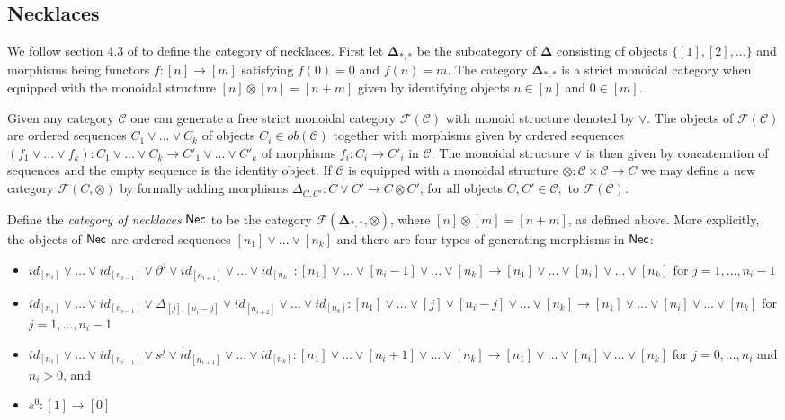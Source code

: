 \subsection{Necklaces} We follow section 4.3 of \cite{Imma, Ralph, Andy} to define the category of necklaces. First let $\mathbf{\Delta}_{*,*}$ be the subcategory of $\mathbf{\Delta}$ consisting of objects $\{ [1], [2],...\}$ and morphisms being functors $f: [n] \to [m]$ satisfying $f(0)=0$ and $f(n)=m$. The category $\mathbf{\Delta}_{*,*}$ is a strict monoidal category when equipped with the monoidal structure $[n] \otimes [m]= [n+m]$ given by identifying objects $n \in [n]$ and $0 \in [m]$.

Given any category $\mathcal{C}$ one can generate a free strict monoidal category $\mathcal{F}(\mathcal{C})$ with monoid structure denoted by $\vee$. The  objects of $\mathcal{F}(\mathcal{C})$ are ordered sequences $C_1 \vee ... \vee C_k$ of objects $C_i \in ob(\mathcal{C})$ together with morphisms given by ordered sequences $(f_1 \vee ... \vee f_k): C_1 \vee ... \vee C_k \to C'_1 \vee ... \vee C'_k$ of morphisms $f_i: C_i \to C'_i$ in $\mathcal{C}.$ The monoidal structure $\vee$ is then given by concatenation of sequences and the empty sequence is the identity object. If $\mathcal{C}$ is equipped with a monoidal structure $\otimes: \mathcal{C} \times \mathcal{C} \to C$ we may define a new category $\mathcal{F}(C, \otimes)$ by formally adding morphisms $\Delta_{C,C'}: C \vee C' \to C \otimes C'$, for all objects $C, C' \in \mathcal{C},$ to $\mathcal{F}(\mathcal{C}).$
 
Define the \textit{category of necklaces} $\mathsf{Nec}$ to be the category  $\mathcal{F}(\mathbf{\Delta}_{*,*}, \otimes)$, where $[n] \otimes [m]=[n+m]$, as defined above. More explicitly, the objects of $\mathsf{Nec}$ are ordered sequences $[n_1] \vee ... \vee[n_k]$ and there are four types of generating morphisms in $\mathsf{Nec}$:
\begin{itemize}
\item $id_{[n_1]} \vee ... \vee id_{[n_{i-1}]} \vee \partial^j \vee id_{[n_{i+1}]} \vee ... \vee id_{[n_k]}: [n_1] \vee ...\vee [n_i-1] \vee... \vee [n_k] \to [n_1] \vee ...\vee [n_i] \vee ...\vee [n_k]$
for $j=1,...,n_i-1$
\item $id_{[n_1]} \vee ... \vee id_{[n_{i-1}]} \vee \Delta_{[j],[n_i-j]} \vee id_{[n_{i+2}]} \vee ... \vee id_{[n_k]}: [n_1] \vee ...\vee [j]\vee [n_{i}-j] \vee... \vee [n_k] \to [n_1] \vee ...\vee [n_i] \vee ...\vee [n_k]$ for $j=1,...,n_i-1$
\item $id_{[n_1]} \vee ... \vee id_{[n_{i-1}]} \vee s^j \vee id_{[n_{i+1}]} \vee ... \vee id_{[n_k]}: [n_1] \vee ...\vee [n_i+1] \vee... \vee [n_k] \to [n_1] \vee ...\vee [n_i] \vee ...\vee [n_k]$ for $j=0,...,n_i$ and $n_i>0$, and 
\item $s^0: [1] \to [0]$
\end{itemize}

